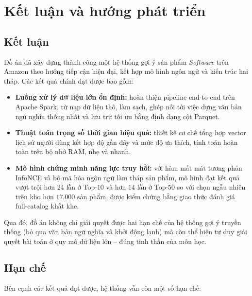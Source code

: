 \chapter{Kết luận và hướng phát triển}
\label{chap:conclusion}

\section{Kết luận}

Đồ án đã xây dựng thành công một hệ thống gợi ý sản phẩm \textit{Software} trên
Amazon theo hướng tiếp cận hiện đại, kết hợp mô hình ngôn ngữ và kiến trúc hai tháp.
Các kết quả chính đạt được bao gồm:

\begin{itemize}[leftmargin=2em, itemsep=2pt]
    \item \textbf{Luồng xử lý dữ liệu lớn ổn định:} hoàn thiện pipeline end-to-end
    trên Apache Spark, từ nạp dữ liệu thô, làm sạch, ghép nối tới việc dựng văn bản
    ngữ nghĩa thống nhất và lưu trữ tối ưu bằng định dạng cột Parquet.
    \item \textbf{Thuật toán trọng số thời gian hiệu quả:} thiết kế cơ chế tổng hợp
    vector lịch sử người dùng kết hợp độ gần đây và mức độ ưa thích, tính toán hoàn
    toàn trên bộ nhớ RAM, nhẹ và nhanh.
    \item \textbf{Mô hình chứng minh năng lực truy hồi:} với hàm mất mát tương phản
    InfoNCE và bộ mã hóa ngôn ngữ làm tháp sản phẩm, mô hình đạt kết quả vượt trội
    hơn $24$ lần ở Top-$10$ và hơn $14$ lần ở Top-$50$ so với chọn ngẫu nhiên trên
    kho hơn $17.000$ sản phẩm, được kiểm chứng bằng giao thức đánh giá full-catalog
    khắt khe.
\end{itemize}

Qua đó, đồ án không chỉ giải quyết được hai hạn chế của hệ thống gợi ý truyền thống
(bỏ qua văn bản ngữ nghĩa và khởi động lạnh) mà còn thể hiện tư duy giải quyết bài
toán ở quy mô dữ liệu lớn -- đúng tinh thần của môn học.

\section{Hạn chế}

Bên cạnh các kết quả đạt được, hệ thống vẫn còn một số hạn chế:

